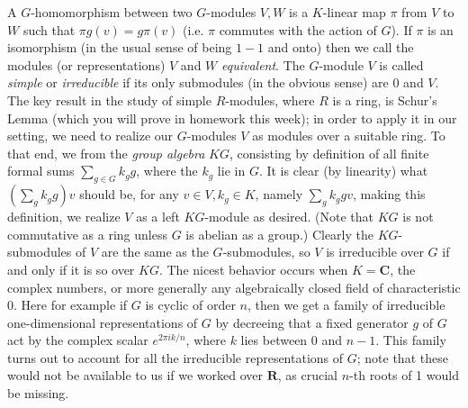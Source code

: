 \documentclass[10pt]{article}
\begin{document}
 A $G$-homomorphism between two $G$-modules $V,W$ is a $K$-linear map
 $\pi$ from $V$ to $W$ such that $\pi g(v) = g\pi(v)$ (i.e. $\pi$
 commutes with the action of $G$). If $\pi$ is an isomorphism (in the
 usual sense of being $1-1$ and onto) then we call the modules (or
 representations) $V$ and $W$ {\sl equivalent}. The $G$-module $V$ is
 called {\sl simple} or {\sl irreducible} if its only submodules (in the
 obvious sense) are 0 and $V$. The key result in the study of simple
 $R$-modules, where $R$ is a ring, is Schur's Lemma (which you will
 prove in homework this week); in order to apply it in our setting, we
 need to realize our $G$-modules $V$ as modules over a suitable ring. To
 that end, we from the {\sl group algebra} $KG$, consisting by
 definition of all finite formal sums $\sum_{g\in G} k_g g$, where the
 $k_g$ lie in $G$. It is clear (by linearity) what $(\sum_g k_g g)v$
 should be, for any $v\in V,k_g\in K$, namely $\sum_g k_g gv$, making
 this definition, we realize $V$ as a left $KG$-module as desired. (Note
 that $KG$ is not commutative as a ring unless $G$ is abelian as a
 group.) Clearly the $KG$-submodules of $V$ are the same as the
 $G$-submodules, so $V$ is irreducible over $G$ if and only if it is so
 over $KG$. The nicest behavior occurs when $K=\mathbf C$, the complex
 numbers, or more generally any algebraically closed field of
 characteristic 0. Here for example if $G$ is cyclic of order $n$, then
 we get a family of irreducible one-dimensional representations of $G$
 by decreeing that a fixed generator $g$ of $G$ act by the complex
 scalar $e^{2\pi ik/n}$, where $k$ lies between 0 and $n-1$. This family
 turns out to account for all the irreducible representations of $G$;
 note that these would not be available to us if we worked over $\mathbf
 R$, as crucial $n$-th roots of 1 would be missing.
\end{document}
